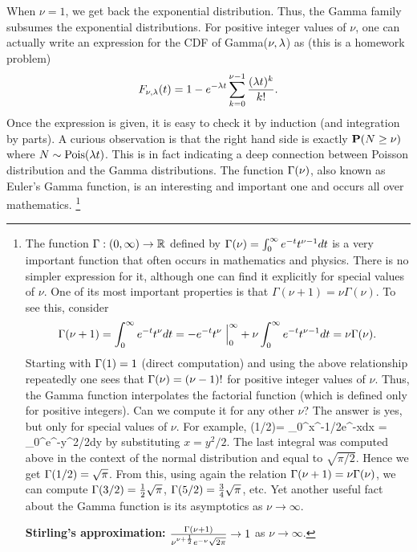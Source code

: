 \documentclass[preprint,  11pt]{amsart}
\begin{document}
When $\nu=1$, we get back the exponential distribution. Thus, the Gamma family subsumes the exponential distributions.   For positive integer values of $\nu$, one can actually write an expression for the CDF of Gamma($\nu,\lam$)  as (this is a homework problem)
$$
F_{\nu,\lam}(t)=1-e^{-\lam t}\summ_{k=0}^{\nu-1}\frac{(\lam t)^{k}}{k!}.
$$
Once the expression is given, it is easy to check it by induction (and integration by parts). A curious observation is that the right hand side is exactly $\P(N\ge \nu)$ where $N\sim \mb{Pois}(\lam t)$. This is in fact indicating a deep connection between Poisson distribution and the Gamma distributions. The function $\Gam(\nu)$, also known as Euler's Gamma function, is an interesting and important  one and occurs all over mathematics.
\footnote{ The function $\Gam:(0,\infty)\to \R$ defined by $\Gam(\nu)=\int_{0}^{\infty}e^{-t}t^{\nu-1}dt$ is a very important function that often occurs in mathematics and physics. There is no simpler expression for it, although one can find it explicitly for special values of $\nu$. One of its most important properties is that $\Gamma(\nu+1)=\nu\Gamma(\nu)$. To see this, consider
$$
\Gam(\nu+1)=\int_{0}^{\infty}e^{-t}t^{\nu}dt = -e^{-t}t^{\nu}\given_{0}^{\infty}+\nu\int_{0}^{\infty}e^{-t}t^{\nu-1}dt = \nu \Gam(\nu).
$$
Starting with  $\Gam(1)=1$ (direct computation) and using the above relationship repeatedly one sees that $\Gam(\nu)=(\nu-1)!$ for positive integer values of $\nu$. Thus, the Gamma function interpolates the factorial function (which is defined only for positive integers).  Can we compute it for any other $\nu$? The answer is yes, but only for special values of $\nu$. For example, 
\ba
\Gam(1/2)= \int_{0}^{\infty}x^{-1/2}e^{-x}dx = \int_{0}^{\infty}e^{-y^{2}/2}dy
\ea
by substituting $x=y^{2}/2$. The last integral was computed above in the context of the normal distribution and equal to $\sqrt{\pi/2}$. Hence we get $\Gam(1/2)=\sqrt{\pi}$. From this, using again the relation $\Gam(\nu+1)=\nu\Gam(\nu)$, we can compute $\Gam(3/2)=\frac{1}{2}\sqrt{\pi}$, $\Gam(5/2)=\frac{3}{4}\sqrt{\pi}$, etc. Yet another useful fact about the Gamma function is its asymptotics as $\nu\to\infty$.

{\bf Stirling's approximation:} $\frac{\Gam(\nu+1)}{\nu^{\nu+\frac{1}{2}}e^{-\nu}\sqrt{2\pi}}\to 1$ as $\nu\to \infty$.

}
\end{document}
